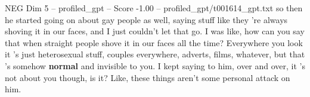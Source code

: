 \begin{textsample}{NEG Dim 5 – profiled\_gpt – Score -1.00 – profiled\_gpt/t001614\_gpt.txt}  \label{ex:f5_neg_027}
so then he started going on about gay people as well, saying stuff like they ’re always shoving it in our faces, and I just couldn't let that go.
I was like, how can you say that when straight people shove it in our faces all the time?
Everywhere you look it ’s just heterosexual stuff, couples everywhere, adverts, films, whatever, but that ’s somehow \textbf{normal} and invisible to you.
I kept saying to him, over and over, it ’s not about you though, is it?
Like, these things aren't some personal attack on him.

\end{textsample}
